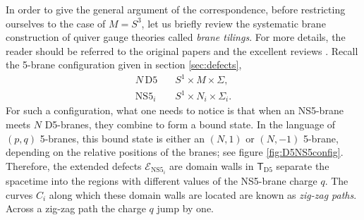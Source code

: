 In order to give the general argument of the correspondence,
before restricting ourselves to the case of $M=S^3$,
let us briefly review the systematic brane construction of quiver gauge theories
called \emph{brane tilings}. For more details, the reader should be
referred to the original papers and the excellent reviews
\cite{Hanany:2005ve,Franco:2005rj,Kennaway:2007tq,Yamazaki:2008bt}.
Recall the 5-brane configuration given in section \ref{sec:defects},
\begin{align*}
    N\,\mathrm{D5}    & \quad S^{1} \times M \times \Sigma,  \\
    \mathrm{NS5}_{i}  & \quad S^{1} \times N_{i} \times \Sigma_{i}.
\end{align*}
For such a configuration, what one needs to notice is that when an
NS5-brane meets $N$ D5-branes, they combine to form a bound state.
In the language of $( p,q )$ 5-branes, this bound state
is either an $( N,1 )$ or $( N,-1 )$ 5-brane,
depending on the relative positions of the branes; see figure \ref{fig:D5NS5config}. Therefore,
the extended defects $\mathcal{E}_{\mathrm{NS5}_{i}}$ are domain
walls in $\mathsf{T}_{\mathrm{D5}}$ separate the spacetime into the
regions with different values of the NS5-brane charge $q$. The curves
$C_{i}$ along which these domain walls are located are known as \emph{zig-zag
paths}. Across a zig-zag path the charge $q$ jump by one.


